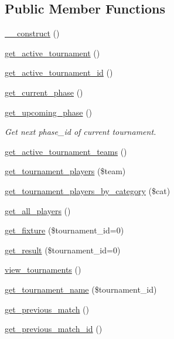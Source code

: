 \subsection*{Public Member Functions}
\begin{DoxyCompactItemize}
\item 
\hyperlink{class_tournament__model_a095c5d389db211932136b53f25f39685}{\+\_\+\+\_\+construct} ()
\item 
\hyperlink{class_tournament__model_ae681965e8413c0294e1a4aaeb342c4bf}{get\+\_\+active\+\_\+tournament} ()
\item 
\hyperlink{class_tournament__model_a938af0306c1d67227a528fbfae41983e}{get\+\_\+active\+\_\+tournament\+\_\+id} ()
\item 
\hyperlink{class_tournament__model_a5d3816836287233945915ab48a8e6242}{get\+\_\+current\+\_\+phase} ()
\item 
\hyperlink{class_tournament__model_a36337861f3ecd511f9fcee1842926557}{get\+\_\+upcoming\+\_\+phase} ()
\begin{DoxyCompactList}\small\item\em Get next {\ttfamily phase\+\_\+id} of current tournament. \end{DoxyCompactList}\item 
\hyperlink{class_tournament__model_a7abc276bb6a1ca913d154a927cf6c572}{get\+\_\+active\+\_\+tournament\+\_\+teams} ()
\item 
\hyperlink{class_tournament__model_a419d4cc6189751f745f28bbe3c4a66b3}{get\+\_\+tournament\+\_\+players} (\$team)
\item 
\hyperlink{class_tournament__model_a1c1e2c31be066bb5a17ef11181218160}{get\+\_\+tournament\+\_\+players\+\_\+by\+\_\+category} (\$cat)
\item 
\hyperlink{class_tournament__model_a24f358ecea9c1af3a015e65d218f50a9}{get\+\_\+all\+\_\+players} ()
\item 
\hyperlink{class_tournament__model_abd4c2097e05706af3407615dfaaf9032}{get\+\_\+fixture} (\$tournament\+\_\+id=0)
\item 
\hyperlink{class_tournament__model_a840498ff96cdf134d325b23f4983d327}{get\+\_\+result} (\$tournament\+\_\+id=0)
\item 
\hyperlink{class_tournament__model_a8826dc4b8e2dd947b880342848fd3698}{view\+\_\+tournaments} ()
\item 
\hyperlink{class_tournament__model_a7404e01586163cf04959f4748bcd7821}{get\+\_\+tournament\+\_\+name} (\$tournament\+\_\+id)
\item 
\hyperlink{class_tournament__model_ae9e4f853c3a51ded8eb00303a09023af}{get\+\_\+previous\+\_\+match} ()
\item 
\hyperlink{class_tournament__model_a563bfb2053b9fcac9d5c35a10ef75c78}{get\+\_\+previous\+\_\+match\+\_\+id} ()
\end{DoxyCompactItemize}


